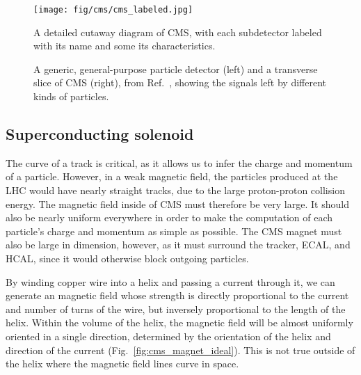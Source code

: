 \begin{figure}[htb]
    \centering
    \texttt{[image: fig/cms/cms\_labeled.jpg]}
    \caption{
        A detailed cutaway diagram of CMS, with each subdetector labeled with its name and some its characteristics. 
    }
    \label{fig:cms_labeled}
\end{figure}

\begin{figure}[htb]
    \centering
    \quad
    \caption{
        A generic, general-purpose particle detector (left) and a transverse slice of CMS (right), from Ref.~\cite{Barney:2120661}, showing the signals left by different kinds of particles.
    }
    \label{fig:cms_particle_id}
\end{figure}

\subsection{Superconducting solenoid}
The curve of a track is critical, as it allows us to infer the charge and momentum of a particle. 
However, in a weak magnetic field, the particles produced at the LHC would have nearly straight tracks, due to the large proton-proton collision energy. 
The magnetic field inside of CMS must therefore be very large. 
It should also be nearly uniform everywhere in order to make the computation of each particle's charge and momentum as simple as possible. 
The CMS magnet must also be large in dimension, however, as it must surround the tracker, ECAL, and HCAL, since it would otherwise block outgoing particles. 

By winding copper wire into a helix and passing a current through it, we can generate an magnetic field whose strength is directly proportional to the current and number of turns of the wire, but inversely proportional to the length of the helix. 
Within the volume of the helix, the magnetic field will be almost uniformly oriented in a single direction, determined by the orientation of the helix and direction of the current (Fig.~\ref{fig:cms_magnet_ideal}). 
This is not true outside of the helix where the magnetic field lines curve in space. 

